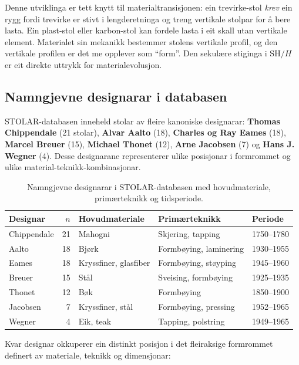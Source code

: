 \documentclass[10pt, a4paper, twocolumn]{article}
\begin{document}
Denne utviklinga er tett knytt til materialtransisjonen: ein trevirke-stol \emph{krev} ein rygg fordi trevirke er stivt i lengderetninga og treng vertikale stolpar for å bere lasta. Ein plast-stol eller karbon-stol kan fordele lasta i eit skall utan vertikale element. Materialet sin mekanikk bestemmer stolens vertikale profil, og den vertikale profilen er det me opplever som ``form''. Den sekulære stiginga i $\text{SH}/H$ er eit direkte uttrykk for materialevolusjon.


\subsection{Namngjevne designarar i databasen}

STOLAR-databasen inneheld stolar av fleire kanoniske designarar: \textbf{Thomas Chippendale} (21 stolar), \textbf{Alvar Aalto} (18), \textbf{Charles og Ray Eames} (18), \textbf{Marcel Breuer} (15), \textbf{Michael Thonet} (12), \textbf{Arne Jacobsen} (7) og \textbf{Hans J. Wegner} (4). Desse designarane representerer ulike posisjonar i formrommet og ulike material-teknikk-kombinasjonar.

\begin{table}[H]
\centering
\caption{Namngjevne designarar i STOLAR-databasen med hovudmateriale, primærteknikk og tidsperiode.}
\label{tab:designers}
\begin{tabular}{@{}lrlll@{}}
\toprule
\textbf{Designar} & \textbf{$n$} & \textbf{Hovudmateriale} & \textbf{Primærteknikk} & \textbf{Periode} \\
\midrule
Chippendale & 21 & Mahogni & Skjering, tapping & 1750--1780 \\
Aalto & 18 & Bjørk & Formbøying, laminering & 1930--1955 \\
Eames & 18 & Kryssfiner, glasfiber & Formbøying, støyping & 1945--1960 \\
Breuer & 15 & Stål & Sveising, formbøying & 1925--1935 \\
Thonet & 12 & Bøk & Formbøying & 1850--1900 \\
Jacobsen & 7 & Kryssfiner, stål & Formbøying, pressing & 1952--1965 \\
Wegner & 4 & Eik, teak & Tapping, polstring & 1949--1965 \\
\bottomrule
\end{tabular}
\end{table}

Kvar designar okkuperer ein distinkt posisjon i det fleiraksige formrommet definert av materiale, teknikk og dimensjonar:
\end{document}
